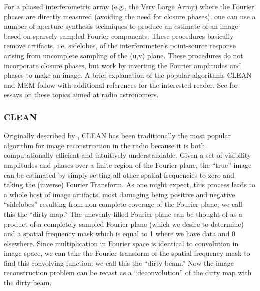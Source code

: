\documentclass[12pt]{iopart}
\begin{document}
For a phased interferometric array (e.g., the Very Large Array) where
the Fourier phases are directly measured (avoiding the need for
closure phases), one can use a number of aperture synthesis techniques
to produce an estimate of an image based on sparsely sampled Fourier
components.  These procedures basically remove artifacts, i.e.
sidelobes, of the interferometer's point-source response arising from
uncomplete sampling of the (u,v) plane.  These procedures do not
incorporate closure phases, but work by inverting the Fourier
amplitudes and phases to make an image.  A brief explanation of the
popular algorithms CLEAN and MEM follow with additional
references for the interested reader.  See \cite{nrao86} for essays on
these topics aimed at radio astronomers.

\subsubsection{CLEAN}
Originally described by \cite{hogbom74}, CLEAN has been traditionally
the most popular algorithm for image reconstruction in the radio
because it is both computationally efficient and intuitively
understandable.  Given a set of visibility amplitudes and phases over
a finite region of the Fourier plane, the ``true'' image can be
estimated by simply setting all other spatial frequencies to zero and
taking the (inverse) Fourier Transform.  As one might expect, this
process leads to a whole host of image artifacts, most damaging being
positive and negative ``sidelobes'' resulting from non-complete
coverage of the Fourier plane; we call this the ``dirty map.''  The
unevenly-filled Fourier plane can be thought of as a product of a
completely-sampled Fourier plane (which we desire to determine) and a
spatial frequency mask which is equal to 1 where we have data and 0
elsewhere.  Since multiplication in Fourier space is identical to
convolution in image space, we can take the Fourier transform of the
spatial frequency mask to find this convolving function; we call this
the ``dirty beam.''  Now the image reconstruction problem can be
recast as a ``deconvolution'' of the dirty map with the dirty beam.
\end{document}
